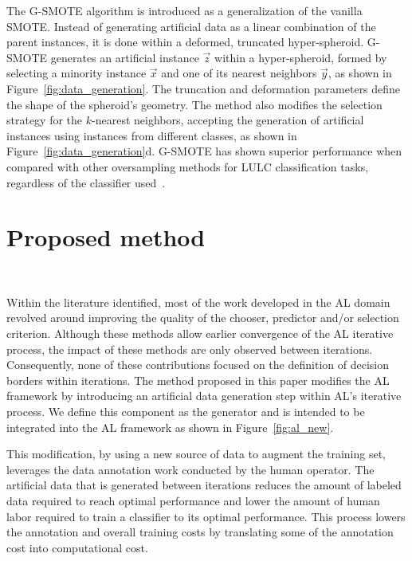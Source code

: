 \documentclass[preprint,12pt]{elsarticle}
\begin{document}
The G-SMOTE algorithm is introduced as a generalization of the vanilla
SMOTE\@. Instead of generating artificial data as a linear combination of the
parent instances, it is done within a deformed, truncated hyper-spheroid.
G-SMOTE generates an artificial instance $\overrightarrow{z}$ within a
hyper-spheroid, formed by selecting a minority instance $\overrightarrow{x}$
and one of its nearest neighbors $\overrightarrow{y}$, as shown in
Figure~\ref{fig:data_generation}. The truncation and deformation parameters
define the shape of the spheroid's geometry. The method also modifies the
selection strategy for the $k$-nearest neighbors, accepting the generation of
artificial instances using instances from different classes, as shown in
Figure~\ref{fig:data_generation}d. G-SMOTE has shown superior performance when
compared with other oversampling methods for LULC classification tasks,
regardless of the classifier used~\cite{Douzas2019class}.

\section{Proposed method}~\label{sec:proposed-method}

Within the literature identified, most of the work developed in the AL domain
revolved around improving the quality of the chooser, predictor and/or
selection criterion. Although these methods allow earlier convergence of the AL
iterative process, the impact of these methods are only observed between
iterations. Consequently, none of these contributions focused on the
definition of decision borders within iterations. The method proposed in this
paper modifies the AL framework by introducing an artificial data generation
step within AL's iterative process. We define this component as the generator
and is intended to be integrated into the AL framework as shown in
Figure~\ref{fig:al_new}. 

This modification, by using a new source of data to augment the training set,
leverages the data annotation work conducted by the human operator. The
artificial data that is generated between iterations reduces the amount of
labeled data required to reach optimal performance and lower the amount of
human labor required to train a classifier to its optimal performance. This
process lowers the annotation and overall training costs by translating some
of the annotation cost into computational cost.
\end{document}
